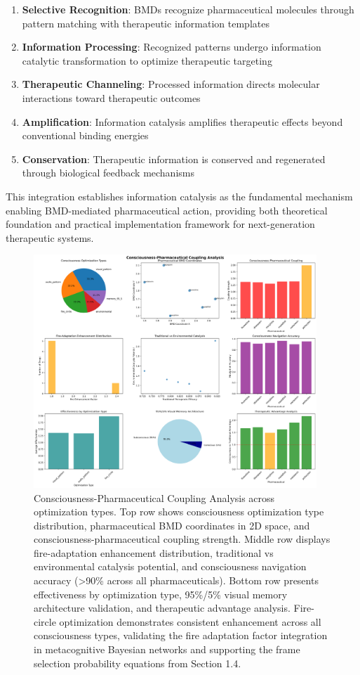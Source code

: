 \documentclass[12pt,a4paper]{article}
\begin{document}
\begin{enumerate}
\item \textbf{Selective Recognition}: BMDs recognize pharmaceutical molecules through pattern matching with therapeutic information templates
\item \textbf{Information Processing}: Recognized patterns undergo information catalytic transformation to optimize therapeutic targeting
\item \textbf{Therapeutic Channeling}: Processed information directs molecular interactions toward therapeutic outcomes
\item \textbf{Amplification}: Information catalysis amplifies therapeutic effects beyond conventional binding energies
\item \textbf{Conservation}: Therapeutic information is conserved and regenerated through biological feedback mechanisms
\end{enumerate}

This integration establishes information catalysis as the fundamental mechanism enabling BMD-mediated pharmaceutical action, providing both theoretical foundation and practical implementation framework for next-generation therapeutic systems.


\begin{figure}[htbp]
    \centering
    \includegraphics[width=0.95\textwidth]{images/consciousness_pharmaceutical_coupling_20251004_100821.png}
    \caption{Consciousness-Pharmaceutical Coupling Analysis across optimization types. Top row shows consciousness optimization type distribution, pharmaceutical BMD coordinates in 2D space, and consciousness-pharmaceutical coupling strength. Middle row displays fire-adaptation enhancement distribution, traditional vs environmental catalysis potential, and consciousness navigation accuracy (>90\% across all pharmaceuticals). Bottom row presents effectiveness by optimization type, 95\%/5\% visual memory architecture validation, and therapeutic advantage analysis. Fire-circle optimization demonstrates consistent enhancement across all consciousness types, validating the fire adaptation factor integration in metacognitive Bayesian networks and supporting the frame selection probability equations from Section 1.4.}
    \label{fig:consciousness_coupling}
    \end{figure}
\end{document}
